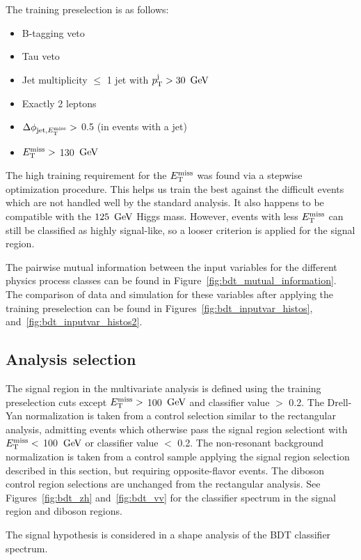 The training preselection is as follows:
\begin{itemize}
\item B-tagging veto
\item Tau veto
\item Jet multiplicity $\leq$ 1 jet with $p_{\mathrm{T}}^{\rm j} > 30~\,\text{Ge\hspace{-.08em}V}$
\item Exactly 2 leptons
\item $\Delta \phi_{{\rm jet},E_\mathrm{T}^{\mathrm{miss}}} >$ 0.5 (in events with a jet)
\item $E_\mathrm{T}^{\mathrm{miss}} >$ 130 $\,\text{Ge\hspace{-.08em}V}$
\end{itemize}
The high training requirement for the $E_\mathrm{T}^{\mathrm{miss}}$ was found via a stepwise optimization procedure.
This helps us train the best against the difficult events which are not handled well by the standard analysis.
It also happens to be compatible with the $125~\,\text{Ge\hspace{-.08em}V}$ Higgs mass.
However, events with less $E_\mathrm{T}^{\mathrm{miss}}$ can still be classified as highly signal-like,
so a looser criterion is applied for the signal region.

The pairwise mutual information between the input variables for the different physics process classes can be found in Figure~\ref{fig:bdt_mutual_information}.
The comparison of data and simulation for these variables after applying the training preselection can be found in Figures~\ref{fig:bdt_inputvar_histos}, and~\ref{fig:bdt_inputvar_histos2}.


\subsection{Analysis selection} 

The signal region in the multivariate analysis is defined using the training preselection cuts except $E_\mathrm{T}^{\mathrm{miss}} >$ 100 $\,\text{Ge\hspace{-.08em}V}$ and classifier value $>$ 0.2. 
The Drell-Yan normalization is taken from a control selection similar to the rectangular analysis, admitting events which otherwise pass the signal region selectiont with $E_\mathrm{T}^{\mathrm{miss}} <$ 100 $\,\text{Ge\hspace{-.08em}V}$ or classifier value $<$ 0.2.
The non-resonant background normalization is taken from a control sample applying the signal region selection 
described in this section, but requiring opposite-flavor events. The diboson control region 
selections are unchanged from the rectangular analysis. See Figures~\ref{fig:bdt_zh} 
and~\ref{fig:bdt_vv} for the classifier spectrum in the signal region and diboson regions.

The signal hypothesis is considered in a shape analysis of the BDT classifier spectrum. 

